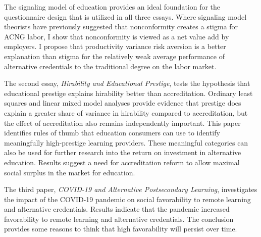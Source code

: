 \documentclass[11 pt]{report}
\begin{document}
\abstractmultiplepage

The signaling model of education provides an ideal foundation for the questionnaire design that is utilized in all three essays. Where signaling model theorists have previously suggested that nonconformity creates a stigma for ACNG labor, I show that nonconformity is viewed as a net value add by employers. I propose that productivity variance risk aversion is a better explanation than stigma for the relatively weak average performance of alternative credentials to the traditional degree on the labor market.

The second essay,
\textit{Hirability and Educational Prestige},
tests the hypothesis that educational prestige explains hirability better than accreditation. Ordinary least squares and linear mixed model analyses provide evidence that prestige does explain a greater share of variance in hirability compared to accreditation, but the effect of accreditation also remains independently important. This paper identifies rules of thumb that education consumers can use to identify meaningfully high-prestige learning providers. These meaningful categories can also be used for further research into the return on investment in alternative education. Results suggest a need for accreditation reform to allow maximal social surplus in the market for education.

The third paper,
\textit{COVID-19 and Alternative Postsecondary Learning},
investigates the impact of the COVID-19 pandemic on social favorability to remote learning and alternative credentials. Results indicate that the pandemic increased favorability to remote learning and alternative credentials. The conclusion provides some reasons to think that high favorability will persist over time.

\startofchapters





% 

\end{document}
